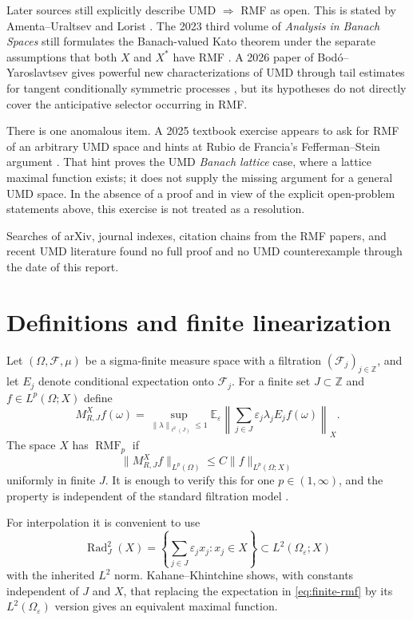 \documentclass[11pt]{article}
\theoremstyle{definition}
\newcommand{\E}{\mathbb E}
\newcommand{\Rad}{\operatorname{Rad}}
\newcommand{\RMF}{\operatorname{RMF}}
\newcommand{\cF}{\mathcal F}
\newcommand{\1}{\mathbf 1}
\newcommand{\eps}{\varepsilon}
\begin{document}
Later sources still explicitly describe UMD $\Rightarrow$ RMF as open.  This
is stated by Amenta--Uraltsev \cite{AmentaUraltsev2020} and Lorist
\cite{Lorist2021}.  The 2023 third volume of \emph{Analysis in Banach Spaces}
still formulates the Banach-valued Kato theorem under the separate assumptions
that both $X$ and $X^*$ have RMF \cite{HNVW2023}.  A 2026 paper of
Bod\'o--Yaroslavtsev gives powerful new characterizations of UMD through tail
estimates for tangent conditionally symmetric processes
\cite{BodoYaroslavtsev2026}, but its hypotheses do not directly cover the
anticipative selector occurring in RMF.

There is one anomalous item.  A 2025 textbook exercise appears to ask for RMF
of an arbitrary UMD space and hints at Rubio de Francia's Fefferman--Stein
argument \cite{UrbinaRios2025}.  That hint proves the UMD \emph{Banach lattice}
case, where a lattice maximal function exists; it does not supply the missing
argument for a general UMD space.  In the absence of a proof and in view of the
explicit open-problem statements above, this exercise is not treated as a
resolution.

Searches of arXiv, journal indexes, citation chains from the RMF papers, and
recent UMD literature found no full proof and no UMD counterexample through the
date of this report.

\section{Definitions and finite linearization}

Let $(\Omega,\cF,\mu)$ be a sigma-finite measure space with a filtration
$(\cF_j)_{j\in\mathbb Z}$, and let $E_j$ denote conditional expectation onto
$\cF_j$.  For a finite set $J\subset\mathbb Z$ and $f\in L^p(\Omega;X)$ define
\begin{equation}\label{eq:finite-rmf}
 M_{R,J}^X f(\omega)
 =\sup_{\|\lambda\|_{\ell^2(J)}\le 1}
   \E_{\eps}\left\|\sum_{j\in J}\eps_j\lambda_j E_jf(\omega)\right\|_X.
\end{equation}
The space $X$ has $\RMF_p$ if
\begin{equation}\label{eq:rmfp}
 \|M_{R,J}^Xf\|_{L^p(\Omega)}\le C\|f\|_{L^p(\Omega;X)}
\end{equation}
uniformly in finite $J$.  It is enough to verify this for one
$p\in(1,\infty)$, and the property is independent of the standard filtration
model \cite{HMP,Kemppainen2011}.

For interpolation it is convenient to use
\[
 \Rad_J^2(X)
 =\left\{\sum_{j\in J}\eps_jx_j:x_j\in X\right\}
 \subset L^2(\Omega_\eps;X)
\]
with the inherited $L^2$ norm.  Kahane--Khintchine shows, with constants
independent of $J$ and $X$, that replacing the expectation in
\eqref{eq:finite-rmf} by its $L^2(\Omega_\eps)$ version gives an equivalent
maximal function.
\end{document}
